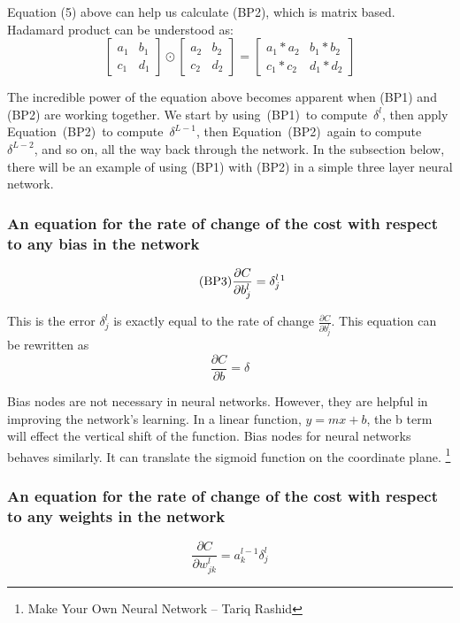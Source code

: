 \documentclass[]{article}
\begin{document}
\begin{multicols}{2}
Equation (5) above can help us calculate (BP2), which is matrix based. Hadamard product can be understood as: 
\[
\begin{bmatrix}
	a_1 & b_1 \\
	c_1 & d_1
\end{bmatrix}
\odot
\begin{bmatrix}
	a_2 & b_2 \\
	c_2 & d_2
\end{bmatrix}
= 
\begin{bmatrix}
	a_1 * a_2 & b_1 * b_2 \\
	c_1 * c_2 & d_1 * d_2
\end{bmatrix}
\]

The incredible power of the equation above becomes apparent when (BP1) and (BP2) are working together. We start by using~(BP1)~to
compute~\(\delta^{l}\), then apply Equation~(BP2)~to
compute~\(\delta^{L - 1}\), then Equation~(BP2)~again to
compute~\(\delta^{L - 2}\), and so on, all the way back through the
network. In the subsection below, there will be an example of using (BP1) with (BP2) in a simple three layer neural network. 

\subsubsection{An equation for the rate of change of the cost with respect to any bias in the network} 
\begin{equation} \tag{BP3}
	\frac{\partial C}{\partial b^l_{j}} = \delta^l_{j}\footnote{The equation was 
		reference from Michael A. Neilson "Neural Networks and Deep Learning",
		Determination Press, 2015~}
\end{equation}

This is the error \(\delta^l_{j}\) is exactly equal to the rate of change \(\frac{\partial C}{\partial b^l_{j}}\). This equation can be rewritten as 
\[\frac{\partial C}{\partial b} = \delta\]

Bias nodes are not necessary in neural networks. However, they are helpful in improving the network's learning. In a linear function, \(y = mx + b\), the b term will effect the vertical shift of the function. Bias nodes for neural networks behaves similarly. It can translate the sigmoid function on the coordinate plane. \footnote{Make Your Own Neural Network -- Tariq Rashid}

\subsubsection{An equation for the rate of change of the cost with respect to any weights in the network}
\begin{equation} \tag{BP4}
	\frac{\partial C}{\partial w^l_{jk}} = a^{l-1}_{k} \delta^l_{j}
\end{equation}


\end{multicols}
\end{document}
